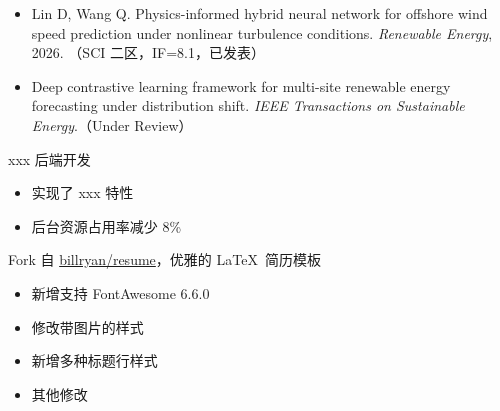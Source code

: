 \vspace{-3pt}

\vspace{-3pt}
\begin{itemize}
  \item Lin D, Wang Q. Physics-informed hybrid neural network for offshore wind speed prediction under nonlinear turbulence conditions. \textit{Renewable Energy}, 2026. （SCI 二区，IF=8.1，已发表）
  \item Deep contrastive learning framework for multi-site renewable energy forecasting under distribution shift. \textit{IEEE Transactions on Sustainable Energy}.（Under Review）
\end{itemize}

xxx 后端开发
\begin{itemize}
  \item 实现了 xxx 特性
  \item 后台资源占用率减少 8\%
\end{itemize}

Fork 自 \href{https://github.com/billryan/resume}{billryan/resume}，优雅的 \LaTeX\ 简历模板
\begin{itemize}
  \item 新增支持 FontAwesome 6.6.0
  \item 修改带图片的样式
  \item 新增多种标题行样式
  \item 其他修改
\end{itemize}


\begin{onehalfspacing}
\end{onehalfspacing}

\begin{onehalfspacing}
\end{onehalfspacing}

\begin{onehalfspacing}
\end{onehalfspacing}

\begin{onehalfspacing}
\end{onehalfspacing}
